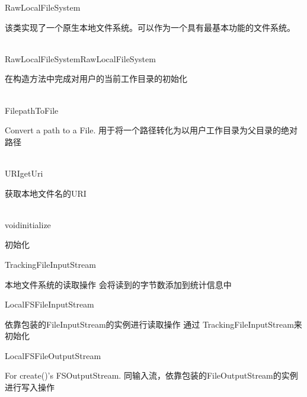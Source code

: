 \begin{XeClass}{RawLocalFileSystem}
   
 该类实现了一个原生本地文件系统。可以作为一个具有最基本功能的文件系统。

  \begin{XeMethod}{\XePublic\\ }{RawLocalFileSystem}{RawLocalFileSystem}
       
 在构造方法中完成对用户的当前工作目录的初始化

  \end{XeMethod}

  \begin{XeMethod}{\XePublic\\ }{File}{pathToFile}
       
 Convert a path to a File.
 用于将一个路径转化为以用户工作目录为父目录的绝对路径

  \end{XeMethod}

  \begin{XeMethod}{\XePublic\\ }{URI}{getUri}
       
 获取本地文件名的URI

  \end{XeMethod}

  \begin{XeMethod}{\XePublic\\ }{void}{initialize}
       
 初始化

  \end{XeMethod}

  \begin{XeInnerClass}{TrackingFileInputStream}
     
 本地文件系统的读取操作
 会将读到的字节数添加到统计信息中

  \end{XeInnerClass}
  \begin{XeInnerClass}{LocalFSFileInputStream}
     
 依靠包装的FileInputStream的实例进行读取操作
 通过 TrackingFileInputStream来初始化

  \end{XeInnerClass}
  \begin{XeInnerClass}{LocalFSFileOutputStream}
     
 For create()'s FSOutputStream.
 同输入流，依靠包装的FileOutputStream的实例进行写入操作

  \end{XeInnerClass}
\end{XeClass}

